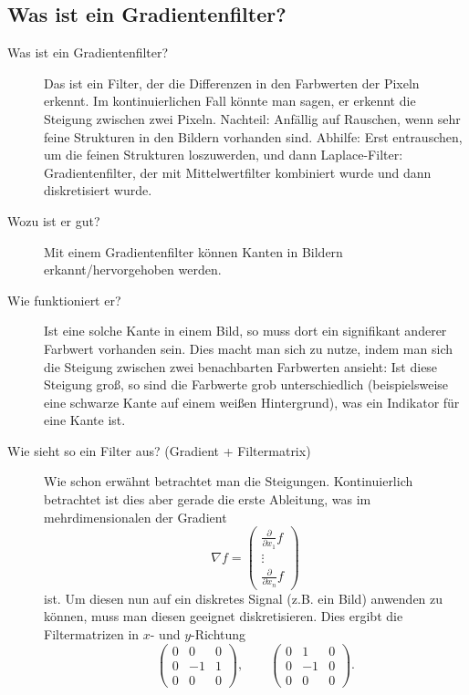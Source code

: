 \subsection{Was ist ein Gradientenfilter?}
\begin{description}
  \item[Was ist ein Gradientenfilter?]
    Das ist ein Filter, der die Differenzen in den Farbwerten der Pixeln erkennt. Im 
    kontinuierlichen Fall könnte man sagen, er erkennt die Steigung zwischen zwei Pixeln.
    Nachteil: Anfällig auf Rauschen, wenn sehr feine Strukturen in den Bildern vorhanden sind.
    Abhilfe: Erst entrauschen, um die feinen Strukturen loszuwerden, und dann 
    Laplace-Filter: Gradientenfilter, der mit Mittelwertfilter kombiniert wurde und dann 
    diskretisiert wurde.
	\item[Wozu ist er gut?]
      Mit einem Gradientenfilter können Kanten in Bildern erkannt/hervorgehoben werden.
	\item[Wie funktioniert er?]
      Ist eine solche Kante in einem Bild, so muss dort ein signifikant anderer Farbwert
      vorhanden sein. Dies macht man sich zu nutze, indem man sich die Steigung zwischen
      zwei benachbarten Farbwerten ansieht: Ist diese Steigung groß, so sind die Farbwerte
      grob unterschiedlich (beispielsweise eine schwarze Kante auf einem weißen Hintergrund),
      was ein Indikator für eine Kante ist.
	\item[Wie sieht so ein Filter aus? (Gradient + Filtermatrix)]
      Wie schon erwähnt betrachtet man die Steigungen. Kontinuierlich betrachtet ist dies
      aber gerade die erste Ableitung, was im mehrdimensionalen der Gradient
      $$ \nabla f = \begin{pmatrix} \frac{\partial}{\partial x_1}f\\ \vdots\\ \frac{\partial}{\partial x_n}f \end{pmatrix} $$
      ist. Um diesen nun auf ein diskretes Signal (z.B. ein Bild) anwenden zu können, muss
      man diesen geeignet diskretisieren. Dies ergibt die Filtermatrizen in $x$- und $y$-Richtung
      $$ 
      \begin{pmatrix}0&0&0\\0&-1&1\\0&0&0\end{pmatrix},\qquad\begin{pmatrix}0&1&0\\0&-1&0\\0&0&0\end{pmatrix}.
$$
\end{description}
